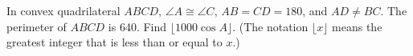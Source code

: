In convex quadrilateral $ABCD$, $\angle A \cong \angle C$, $AB = CD = 180$, and $AD \neq BC$.  The perimeter of $ABCD$ is 640.  Find $\lfloor 1000 \cos A \rfloor$.  (The notation $\lfloor x \rfloor$ means the greatest integer that is less than or equal to $x$.)